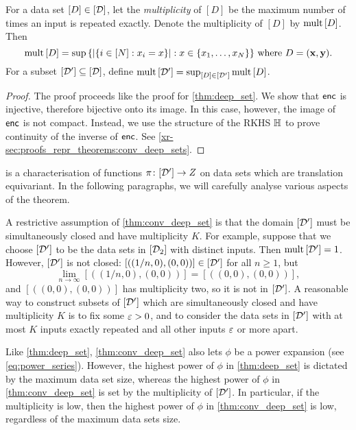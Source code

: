 \documentclass[12pt, twoside]{report}
\newcommand{\xrprefix}[1]{xr-#1}
\begin{document}
\begin{definition}
    For a data set $[D] \in [\mathcal{D}]$, let the \emph{multiplicity} of $[D]$ be the maximum number of times an input is repeated exactly.
    Denote the multiplicity of $[D]$ by $\operatorname{mult}\,[D]$.
    Then
    \begin{equation}
        \operatorname{mult}\,[D]
        = \operatorname*{sup}\, \{\lvert\{i \in [N]: x_i = x\}\rvert :  x \in \{x_1, \ldots, x_{N}\}\}
        \text{ where } D = (\mathbf{x}, \mathbf{y}).
    \end{equation}
    For a subset $[\mathcal{D}'] \subseteq [\mathcal{D}]$, define $\operatorname{mult}\,[\mathcal{D}'] = \operatorname*{sup}_{[D] \in [\mathcal{D}']} \operatorname{mult}\,[D]$.
\end{definition}

\begin{proof}
    The proof proceeds like the proof for \cref{thm:deep_set}.
    We show that $\mathsf{enc}$ is injective, therefore bijective onto its image.
    In this case, however, the image of $\mathsf{enc}$ is not compact. 
    Instead, we use the structure of the RKHS $\mathbb{H}$ to prove continuity of the inverse of $\mathsf{enc}$.
    See \cref{\xrprefix{sec:proofs_repr_theorems:conv_deep_sets}}.
\end{proof}

 is a characterisation of functions $\pi \colon [\mathcal{D}'] \to Z$ on data sets which are translation equivariant.
In the following paragraphs, we will carefully analyse various aspects of the theorem.

A restrictive assumption of \cref{thm:conv_deep_set} is that the domain $[\mathcal{D}']$ must be simultaneously closed and have multiplicity $K$.
For example, suppose that we choose $[\mathcal{D}']$ to be the data sets in $[\mathcal{D}_2]$ with distinct inputs.
Then $\operatorname{mult}\,[\mathcal{D}']=1$.
However, $[\mathcal{D}']$ is not closed: $[((1/n, 0), (0, 0))] \in [\mathcal{D}']$ for all $n \ge 1$, but
\begin{equation}
    \lim_{n \to \infty}[((1/n, 0), (0, 0))] = [((0, 0), (0, 0))],
\end{equation}
and $[((0, 0), (0, 0))]$ has multiplicity two, so it is not in $[\mathcal{D}']$.
A reasonable way to construct subsets of $[\mathcal{D}']$ which are simultaneously closed and have multiplicity $K$ is to fix some $\varepsilon > 0$, and to consider the data sets in $[\mathcal{D}']$ with at most $K$ inputs exactly repeated and all other inputs $\varepsilon$ or more apart.

Like \cref{thm:deep_set}, \cref{thm:conv_deep_set} also lets $\phi$ be a power expansion (see \eqref{eq:power_series}).
However, the highest power of $\phi$ in \cref{thm:deep_set} is dictated by the maximum data set size, whereas the highest power of $\phi$ in \cref{thm:conv_deep_set} is set by the multiplicity of $[\mathcal{D}']$.
In particular, if the multiplicity is low, then the highest power of $\phi$ in \cref{thm:conv_deep_set} is low, regardless of the maximum data sets size.
\end{document}
